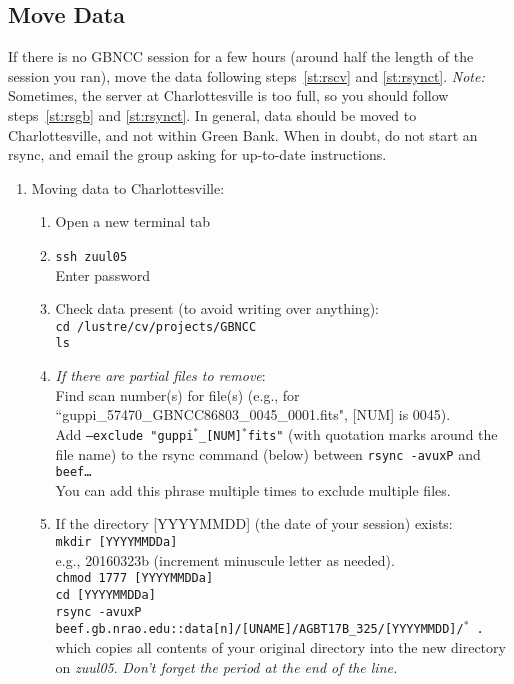 \documentclass[11pt]{article}
\begin{document}
\subsection{Move Data}\label{ssec:rsync}  %
If there is no GBNCC session for a few hours (around half the length of the session you ran), move the data following steps~\ref{st:rscv} and \ref{st:rsynct}. \textit{Note:} Sometimes, the server at Charlottesville is too full, so you should follow steps~\ref{st:rsgb} and \ref{st:rsynct}. In general, data should be moved to Charlottesville, and not within Green Bank. When in doubt, do not start an rsync, and email the group asking for up-to-date instructions.  \begin{enumerate}
 \item\label{st:rscv} Moving data to Charlottesville: \begin{enumerate}
  \item Open a new terminal tab
  \item \texttt{ssh zuul05} \\
  Enter password
  \item Check data present (to avoid writing over anything):\\
  \texttt{cd /lustre/cv/projects/GBNCC \\
  ls} 
  \item\textit{If there are partial files to remove}: \\
  Find scan number(s) for file(s) (e.g., for ``guppi\_57470\_GBNCC86803\_0045\_0001.fits", [NUM] is 0045). \\
  Add \texttt{--exclude "guppi$^*$\_[NUM]$^*$fits"} (with quotation marks around the file name) to the rsync command (below) between \texttt{rsync -avuxP} and \texttt{beef\dots} \\
  You can add this phrase multiple times to exclude multiple files.  
  \item If the directory [YYYYMMDD] (the date of your session) exists: \\
  \texttt{mkdir [YYYYMMDDa]} \\
  e.g., 20160323b (increment minuscule letter as needed). \\
  \texttt{chmod 1777 [YYYYMMDDa] \\ 
  cd [YYYYMMDDa] \\
  rsync -avuxP beef.gb.nrao.edu::data[n]/[UNAME]/AGBT17B\_325/[YYYYMMDD]/$^*$\,.} \\
  which copies all contents of your original directory into the new directory on \textit{zuul05}.    \textit{Don't forget the period at the end of the line.}

\end{enumerate}
\end{enumerate}
\end{document}
